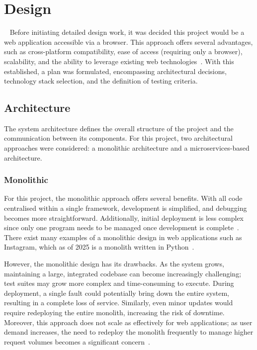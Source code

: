 \chapter{Design}~\label{cha:design}
Before initiating detailed design work, it was decided this project would be a web application accessible via a browser. This approach offers several advantages, such as cross-platform compatibility, ease of access (requiring only a browser), scalability, and the ability to leverage existing web technologies~\cite{6822300}. With this established, a plan was formulated, encompassing architectural decisions, technology stack selection, and the definition of testing criteria.

\section{Architecture}
The system architecture defines the overall structure of the project and the communication between its components. For this project, two architectural approaches were considered: a monolithic architecture and a microservices-based architecture.

\subsection{Monolithic}
For this project, the monolithic approach offers several benefits. With all code centralised within a single framework, development is simplified, and debugging becomes more straightforward. Additionally, initial deployment is less complex since only one program needs to be managed once development is complete~\cite{9109514}. There exist many examples of a monolithic design in web applications such as Instagram, which as of 2025 is a monolith written in Python~\cite{InstagramMonolith}.

However, the monolithic design has its drawbacks. As the system grows, maintaining a large, integrated codebase can become increasingly challenging; test suites may grow more complex and time-consuming to execute. During deployment, a single fault could potentially bring down the entire system, resulting in a complete loss of service. Similarly, even minor updates would require redeploying the entire monolith, increasing the risk of downtime. Moreover, this approach does not scale as effectively for web applications; as user demand increases, the need to redeploy the monolith frequently to manage higher request volumes becomes a significant concern~\cite{9109514}.

